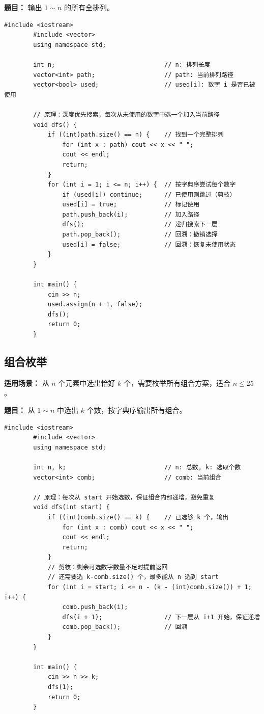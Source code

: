 \documentclass[12pt,a4paper]{ctexart}
\begin{document}
	\textbf{题目：} 输出 $1 \sim n$ 的所有全排列。
	
	\begin{lstlisting}[caption={DFS回溯生成全排列}]
		#include <iostream>
		#include <vector>
		using namespace std;
		
		int n;                              // n: 排列长度
		vector<int> path;                   // path: 当前排列路径
		vector<bool> used;                  // used[i]: 数字 i 是否已被使用
		
		// 原理：深度优先搜索，每次从未使用的数字中选一个加入当前路径
		void dfs() {
			if ((int)path.size() == n) {    // 找到一个完整排列
				for (int x : path) cout << x << " ";
				cout << endl;
				return;
			}
			for (int i = 1; i <= n; i++) {  // 按字典序尝试每个数字
				if (used[i]) continue;      // 已使用则跳过（剪枝）
				used[i] = true;             // 标记使用
				path.push_back(i);          // 加入路径
				dfs();                      // 递归搜索下一层
				path.pop_back();            // 回溯：撤销选择
				used[i] = false;            // 回溯：恢复未使用状态
			}
		}
		
		int main() {
			cin >> n;
			used.assign(n + 1, false);
			dfs();
			return 0;
		}
	\end{lstlisting}
	
	\subsection{组合枚举}
	\textbf{适用场景：} 从 $n$ 个元素中选出恰好 $k$ 个，需要枚举所有组合方案，适合 $n \le 25$。
	
	\textbf{题目：} 从 $1 \sim n$ 中选出 $k$ 个数，按字典序输出所有组合。
	
	\begin{lstlisting}[caption={DFS枚举组合（字典序）}]
		#include <iostream>
		#include <vector>
		using namespace std;
		
		int n, k;                           // n: 总数, k: 选取个数
		vector<int> comb;                   // comb: 当前组合
		
		// 原理：每次从 start 开始选数，保证组合内部递增，避免重复
		void dfs(int start) {
			if ((int)comb.size() == k) {    // 已选够 k 个，输出
				for (int x : comb) cout << x << " ";
				cout << endl;
				return;
			}
			// 剪枝：剩余可选数字数量不足时提前返回
			// 还需要选 k-comb.size() 个，最多能从 n 选到 start
			for (int i = start; i <= n - (k - (int)comb.size()) + 1; i++) {
				comb.push_back(i);
				dfs(i + 1);                 // 下一层从 i+1 开始，保证递增
				comb.pop_back();            // 回溯
			}
		}
		
		int main() {
			cin >> n >> k;
			dfs(1);
			return 0;
		}
	\end{lstlisting}
	
\end{document}
